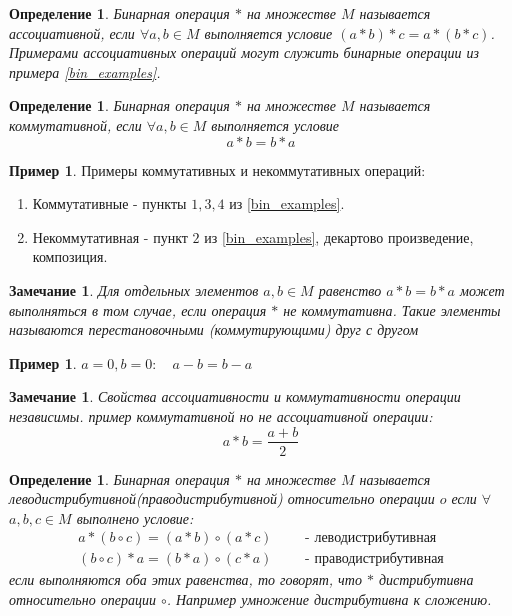 \documentclass[12pt,oneside]{article}
\newtheorem{determ}[theorem]{Определение}
\newtheorem{ffff}[theorem]{Замечание}
\theoremstyle{definition}
\newtheorem{example}[theorem]{Пример}
\begin{document}
\begin{determ}
	Бинарная операция $*$ на множестве $M$ называется ассоциативной, если $\forall a,b \in M$ выполняется условие $(a*b)*c = a*(b*c)$.\\
	Примерами ассоциативных операций могут служить бинарные операции из примера  \ref{bin_examples}.
\end{determ}

\begin{determ}
	Бинарная операция $*$ на множестве $M$ называется коммутативной, если $\forall a,b \in M$ выполняется условие
	\begin{equation}
		a*b=b*a
	\end{equation}
\end{determ}

\begin{example}
	Примеры коммутативных и некоммутативных операций:
	\begin{enumerate}
		\item Коммутативные - пункты $1, 3, 4$ из \ref{bin_examples}.
		\item Некоммутативная - пункт $2$ из \ref{bin_examples}, декартово произведение, композиция.
	\end{enumerate}
\end{example}

\begin{ffff}
	Для отдельных элементов $a,b \in M$ равенство $a*b=b*a$ может выполняться в том случае, если операция $*$ не коммутативна. Такие элементы называются перестановочными (коммутирующими) друг с другом
\end{ffff}

\begin{example}
	$a=0, b=0: \quad a-b=b-a$
\end{example}

\begin{ffff}
	Свойства ассоциативности и коммутативности операции независимы. пример коммутативной но не ассоциативной операции:
	\begin{equation}
	a*b=\frac{a+b}{2}
	\end{equation}
\end{ffff}

\begin{determ}
	Бинарная операция $*$ на множестве $M$ называется леводистрибутивной(праводистрибутивной) относительно операции $o$ если $\forall$ $a,b,c \in M$ выполнено условие:
	\begin{gather}
	a*(b \circ c) = (a*b)\circ(a*c) \qquad\mbox{ - леводистрибутивная}\\
	(b \circ c)*a = (b*a)\circ(c*a) \qquad\mbox{ - праводистрибутивная}
	\end{gather}
	если выполняются оба этих равенства, то говорят, что $*$ дистрибутивна относительно операции $\circ$. Например умножение дистрибутивна к сложению.
\end{determ}
\end{document}
